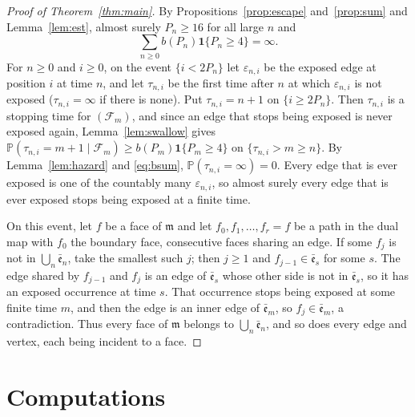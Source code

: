 \documentclass[11pt]{amsart}
\theoremstyle{remark}
\numberwithin{equation}{section}
\newcommand{\Pp}{\mathbb P}
\newcommand{\1}{\mathbf 1}
\newcommand{\F}{\mathcal F}
\begin{document}
\begin{proof}[Proof of Theorem~\ref{thm:main}]
By Propositions~\ref{prop:escape} and~\ref{prop:sum} and Lemma~\ref{lem:est}, almost surely $P_n\ge16$ for all large $n$ and
\begin{equation}\label{eq:bsum}
\sum_{n\ge0}b(P_n)\1\{P_n\ge4\}=\infty .
\end{equation}
For $n\ge0$ and $i\ge0$, on the event $\{i<2P_n\}$ let $\varepsilon_{n,i}$ be the exposed edge at position $i$ at time $n$, and let $\tau_{n,i}$ be the first time after $n$ at which $\varepsilon_{n,i}$ is not exposed ($\tau_{n,i}=\infty$ if there is none). Put $\tau_{n,i}=n+1$ on $\{i\ge2P_n\}$. Then $\tau_{n,i}$ is a stopping time for $(\F_m)$, and since an edge that stops being exposed is never exposed again, Lemma~\ref{lem:swallow} gives $\Pp(\tau_{n,i}=m+1\mid\F_m)\ge b(P_m)\1\{P_m\ge4\}$ on $\{\tau_{n,i}>m\ge n\}$. By Lemma~\ref{lem:hazard} and \eqref{eq:bsum}, $\Pp(\tau_{n,i}=\infty)=0$. Every edge that is ever exposed is one of the countably many $\varepsilon_{n,i}$, so almost surely every edge that is ever exposed stops being exposed at a finite time.

On this event, let $f$ be a face of $\mathfrak m$ and let $f_0,f_1,\dots,f_r=f$ be a path in the dual map with $f_0$ the boundary face, consecutive faces sharing an edge. If some $f_j$ is not in $\bigcup_n\bar{\mathfrak e}_n$, take the smallest such $j$; then $j\ge1$ and $f_{j-1}\in\bar{\mathfrak e}_s$ for some $s$. The edge shared by $f_{j-1}$ and $f_j$ is an edge of $\bar{\mathfrak e}_s$ whose other side is not in $\bar{\mathfrak e}_s$, so it has an exposed occurrence at time $s$. That occurrence stops being exposed at some finite time $m$, and then the edge is an inner edge of $\bar{\mathfrak e}_m$, so $f_j\in\bar{\mathfrak e}_m$, a contradiction. Thus every face of $\mathfrak m$ belongs to $\bigcup_n\bar{\mathfrak e}_n$, and so does every edge and vertex, each being incident to a face.
\end{proof}

\section{Computations}\label{sec:numerics}
\end{document}
